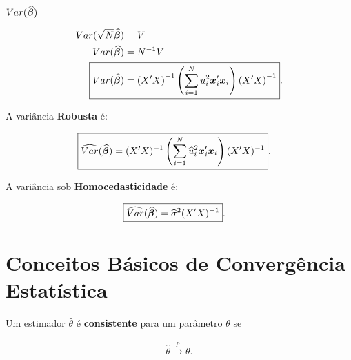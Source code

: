 \documentclass[11pt,oneside,a4paper]{article}
\numberwithin{equation}{section}
\begin{document}
\noindent
$Var(\widehat{\boldsymbol{\beta}})$ 

\vspace{-1 em}
\begin{align*}
Var(\sqrt{N} \betahatbold) &= V
\\
Var(\betahatbold) &= N^{-1} V
\\
\Aboxed{
Var(\betahatbold) &= 
\left( X'X \right)^{-1}
\left( \sum_{i=1}^{N} u_{i}^2 \mbs{x}_{i}' \mbs{x}_{i} \right)
\left( X'X \right)^{-1} }.
\end{align*}

A variância \textbf{Robusta} é:

\vspace{-1 em}
\begin{align*}
\Aboxed{
\widehat{Var}(\betahatbold) &= 
(X'X)^{-1} 
\left( \sum_{i=1}^{N} \widehat{u}_{i}^{2} \mbs{x}_{i}' \mbs{x}_{i} \right)
(X'X)^{-1} }.
\end{align*}

A variância sob \textbf{Homocedasticidade} é:

\vspace{-1 em}
\begin{align*}
	\Aboxed{\widehat{Var}(\betahatbold) &= \widehat{\sigma}^{2} (X' X)^{-1}} .
\end{align*}

\clearpage
\section*{Conceitos Básicos de Convergência Estatística}

\begin{def1}
Um estimador $\hat{\theta}$ é \textbf{consistente} para um parâmetro $\theta$ se 

\vspace{-1 em}
\begin{align*}
\hat{\theta} \overset{p}{\longrightarrow} \theta.
\end{align*}
\end{def1}
\end{document}
